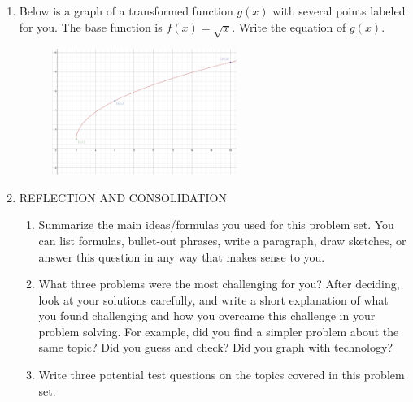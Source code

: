 \documentclass[12pt]{amsart}
\begin{document}
\begin{enumerate}
\item Below is a graph of a transformed function $g(x)$ with several points labeled for you.  The base function is $f(x)=\sqrt{x}$.  Write the equation of $g(x)$.  
\begin{figure}[!h]
\includegraphics[width=6cm]{sqrt.png}
\end{figure}

 
\item REFLECTION AND CONSOLIDATION 
\begin{enumerate}
\item Summarize the main ideas/formulas you used for this problem set.  You can list formulas, bullet-out phrases, write a paragraph, draw sketches, or answer this question in any way that makes sense to you.
\item What three problems were the most challenging for you?  After deciding, look at your solutions carefully, and write a short explanation of what you found challenging and how you overcame this challenge in your problem solving.  For example, did you find a simpler problem about the same topic?  Did you guess and check?  Did you graph with technology?
\item Write three potential test questions on the topics covered in this problem set.
\end{enumerate}
      


\end{enumerate}
\end{document}

